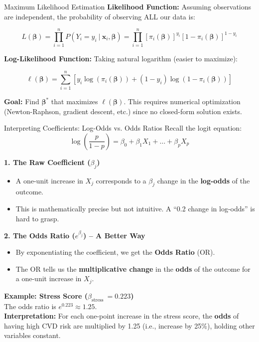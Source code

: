 \documentclass[aspectratio=169,ignorenonframetext]{beamer}
\begin{document}
\begin{frame}{Maximum Likelihood Estimation}
\textbf{Likelihood Function:} Assuming observations are independent, the
probability of observing ALL our data is:

\[L\left( \mathbf{\beta} \right) = \prod_{i = 1}^{n}P\left( Y_{i} = y_{i}~|~\mathbf{x}_{i},\mathbf{\beta} \right) = \prod_{i = 1}^{n}\left\lbrack \pi_{i}\left( \mathbf{\beta} \right) \right\rbrack^{y_{i}}\left\lbrack 1 - \pi_{i}\left( \mathbf{\beta} \right) \right\rbrack^{1 - y_{i}}\]

\textbf{Log-Likelihood Function:} Taking natural logarithm (easier to
maximize):

\[\ell(\mathbf{\beta}) = \sum_{i = 1}^{n}\left\lbrack y_{i}\log(\pi_{i}\left( \mathbf{\beta} \right)) + \left( 1 - y_{i} \right)\log(1 - \pi_{i}\left( \mathbf{\beta} \right)) \right\rbrack\]

\textbf{Goal:} Find \(\mathbf{\beta}^{\ast}\) that maximizes
\(\ell(\mathbf{\beta})\). This requires numerical optimization
(Newton-Raphson, gradient descent, etc.) since no closed-form solution
exists.
\end{frame}

\begin{frame}[shrink]{Interpreting Coefficients: Log-Odds vs. Odds Ratios}
Recall the logit equation:
\[\log(\frac{p}{1 - p}) = \beta_{0} + \beta_{1}X_{1} + \ldots + \beta_{p}X_{p}\]

\textbf{1. The Raw Coefficient (\(\beta_{j}\))}

\begin{itemize}
\item
  A one-unit increase in \(X_{j}\) corresponds to a \(\beta_{j}\) change
  in the \textbf{log-odds} of the outcome.
\item
  This is mathematically precise but not intuitive. A ``0.2 change in
  log-odds'' is hard to grasp.
\end{itemize}

\textbf{2. The Odds Ratio (\(e^{\beta_{j}}\)) -- A Better Way}

\begin{itemize}
\item
  By exponentiating the coefficient, we get the \textbf{Odds Ratio}
  (OR).
\item
  The OR tells us the \textbf{multiplicative change} in the
  \textbf{odds} of the outcome for a one-unit increase in \(X_{j}\).
\end{itemize}

\textbf{Example: Stress Score (\(\beta_{\text{stress }} = 0.223\))}\\
The odds ratio is \(e^{0.223} \approx 1.25\).\\
\textbf{Interpretation:} For each one-point increase in the stress
score, the \textbf{odds} of having high CVD risk are multiplied by 1.25
(i.e., increase by 25\%), holding other variables constant.
\end{frame}
\end{document}
